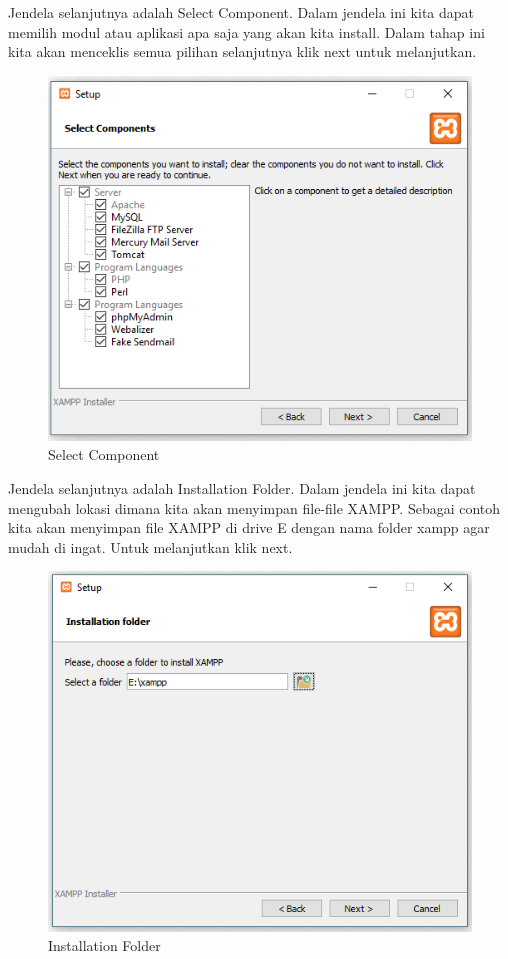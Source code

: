 Jendela selanjutnya adalah Select Component. Dalam jendela ini kita dapat memilih modul atau aplikasi apa saja yang akan kita install. Dalam tahap ini kita akan menceklis semua pilihan selanjutnya klik next untuk melanjutkan.

\begin{figure}[h]
\centering
\includegraphics[scale=0.5]{figures/selectcomponent}
\caption{Select Component}
\end{figure}

Jendela selanjutnya adalah Installation Folder. Dalam jendela ini kita dapat mengubah lokasi dimana kita akan menyimpan file-file XAMPP. Sebagai contoh kita akan menyimpan file XAMPP di drive E dengan nama folder xampp agar mudah di ingat. Untuk melanjutkan klik next.

\begin{figure}[h]
\centering
\includegraphics[scale=0.5]{figures/installationfolder}
\caption{Installation Folder}
\end{figure}

